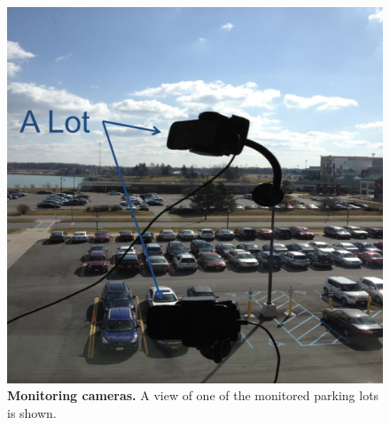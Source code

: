 \begin{figure}
\centering
\includegraphics[width=\columnwidth]{./figures/Camera_setting.pdf}

\caption{\textbf{Monitoring cameras.} A view of one of the monitored parking
lots is shown.}

\label{fig-camera}
\end{figure}
